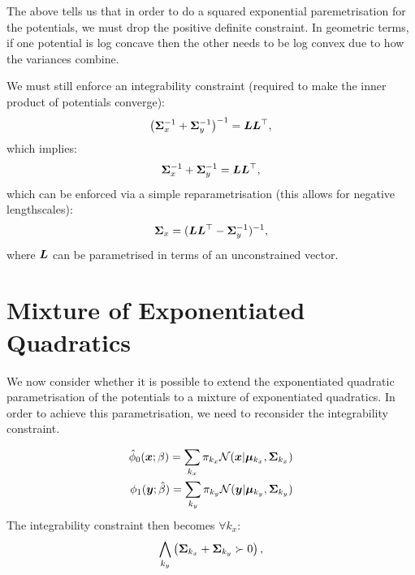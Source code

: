 \documentclass[a4paper,12pt,twoside,openright]{report}
\theoremstyle{definition}
\begin{document}
The above tells us that in order to do a squared exponential paremetrisation for the potentials, we must drop the positive definite constraint. In geometric terms, if one potential is log concave then the other needs to be log convex due to how the variances combine.

We must still enforce an integrability constraint (required to make the inner product of potentials converge):
\begin{align*}
\left({\bm{\Sigma}}_x^{-1} +{\bm{\Sigma}}_y^{-1}\right)^{-1} = {\bm{L}}{\bm{L}}^{\top},
\end{align*}
which implies:
\begin{align*}
{\bm{\Sigma}}_x^{-1} +{\bm{\Sigma}}_y^{-1} = {\bm{L}}{\bm{L}}^{\top},
\end{align*}
which can be enforced via a simple reparametrisation (this allows for negative lengthscales):
\begin{align*}
{\bm{\Sigma}}_x = ({\bm{L}}{\bm{L}}^{\top} -{\bm{\Sigma}}_y^{-1})^{-1},
\end{align*}
where ${\bm{L}}$ can be parametrised in terms of an unconstrained vector.
\section{Mixture of Exponentiated Quadratics}


We now consider whether it is possible to extend the exponentiated quadratic  parametrisation of the potentials to a mixture of exponentiated quadratics. In order to achieve this parametrisation, we need to reconsider the integrability constraint.

\begin{align}
{\hat{\phi}}_0( {\bm{x}} ; \beta) =  \sum_{k_x} \pi_{k_x} {\mathcal{N}}({\bm{x}} | {\bm{\mu}}_{k_x}, {\bm{\Sigma}}_{k_x}) \\
\phi_1( {\bm{y}} ; \hat{\beta}) = \sum_{k_y} \pi_{k_y}  {\mathcal{N}}({\bm{y}} | {\bm{\mu}}_{k_y}, {\bm{\Sigma}}_{k_y}) 
\end{align}
The integrability constraint then becomes $\forall k_x$:
\begin{align*}
   \bigwedge_{k_y} \left({\bm{\Sigma}}_{k_x} +{\bm{\Sigma}}_{k_y} \succ 0\right), 
\end{align*}
\end{document}
